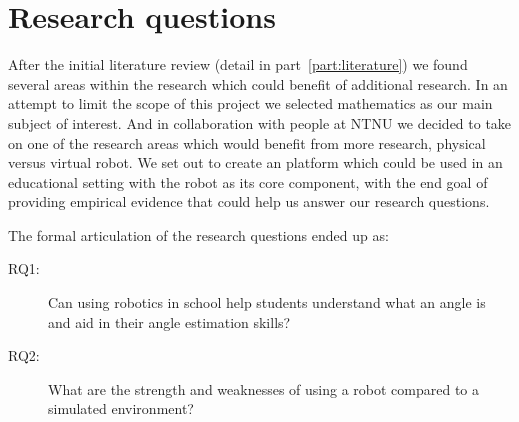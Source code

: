 \chapter{Research questions}
After the initial literature review (detail in part~\ref{part:literature}) we found several areas within the research which could benefit of additional research. 
In an attempt to limit the scope of this project we selected mathematics as our main subject of interest. And in collaboration with people at NTNU we decided to take on one of the research areas which would benefit from more research, physical versus virtual robot. 
We set out to create an platform which could be used in an educational setting with the \chirp robot as its core component, with the end goal of providing empirical evidence that could help us answer our research questions. 

\bigskip\noindent
The formal articulation of the research questions ended up as:
\begin{description}
	\item[RQ1: ] Can using robotics in school help students understand what an angle is and aid in their angle estimation skills?
	\item[RQ2: ] What are the strength and weaknesses of using a robot compared to a simulated environment?
\end{description}
